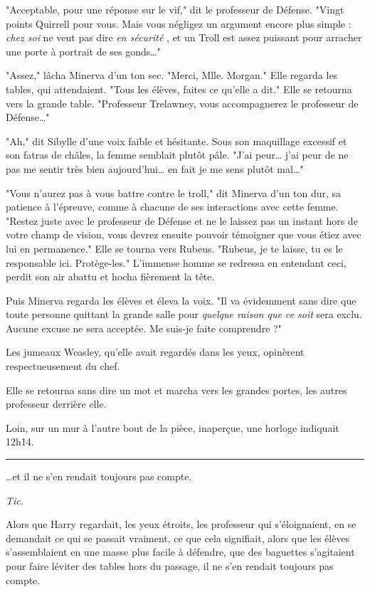 "Acceptable, pour une réponse sur le vif," dit le professeur de Défense. "Vingt points Quirrell pour vous. Mais vous négligez un argument encore plus simple : \emph{chez soi}  ne veut pas dire \emph{en sécurité} , et un Troll est assez puissant pour arracher une porte à portrait de ses gonds…"

"Assez," lâcha Minerva d'un ton sec. "Merci, Mlle. Morgan." Elle regarda les tables, qui attendaient. "Tous les élèves, faites ce qu'elle a dit." Elle se retourna vers la grande table. "Professeur Trelawney, vous accompagnerez le professeur de Défense…"

"Ah," dit Sibylle d'une voix faible et hésitante. Sous son maquillage excessif et son fatras de châles, la femme semblait plutôt pâle. "J'ai peur… j'ai peur de ne pas me sentir très bien aujourd'hui… en fait je me sens plutôt mal…"

"Vous n'aurez pas à vous battre contre le troll," dit Minerva d'un ton dur, sa patience à l'épreuve, comme à chacune de ses interactions avec cette femme. "Restez juste avec le professeur de Défense et ne le laissez pas un instant hors de votre champ de vision, vous devrez ensuite pouvoir témoigner que vous étiez avec lui en permanence." Elle se tourna vers Rubeus. "Rubeus, je te laisse, tu es le responsable ici. Protège-les." L'immense homme se redressa en entendant ceci, perdit son air abattu et hocha fièrement la tête.

Puis Minerva regarda les élèves et éleva la voix. "Il va évidemment sans dire que toute personne quittant la grande salle pour \emph{quelque raison que ce soit}  sera exclu. Aucune excuse ne sera acceptée. Me suis-je faite comprendre ?"

Les jumeaux Weasley, qu'elle avait regardés dans les yeux, opinèrent respectueusement du chef.

Elle se retourna sans dire un mot et marcha vers les grandes portes, les autres professeur derrière elle.

Loin, sur un mur à l'autre bout de la pièce, inaperçue, une horloge indiquait 12h14.
\par\noindent\rule{\textwidth}{0.4pt}
…et il ne s'en rendait toujours pas compte.

\emph{Tic.} 

Alors que Harry regardait, les yeux étroits, les professeur qui s'éloignaient, en se demandait ce qui se passait vraiment, ce que cela signifiait, alors que les élèves s'assemblaient en une masse plus facile à défendre, que des baguettes s'agitaient pour faire léviter des tables hors du passage, il ne s'en rendait toujours pas compte.

